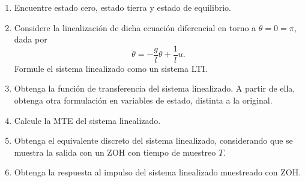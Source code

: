 \documentclass[
  11pt,
  letterpaper,
   addpoints,
  answers
  ]{exam}
\begin{document}
\begin{questions}
\begin{enumerate}
    \item Encuentre estado cero, estado tierra y estado de equilibrio.
    \item Considere la linealización de dicha ecuación diferencial en torno a $\theta = 0 = \pi$, dada por
    \begin{equation}
        \ddot{\theta} = -\frac{g}{l} \theta + \frac{1}{l} u.
    \end{equation}
    Formule el sistema linealizado como un sistema LTI.
    \item Obtenga la función de transferencia del sistema linealizado. A partir de ella, obtenga otra formulación en variables de estado, distinta a la original.
    \item Calcule la MTE del sistema linealizado.
    \item Obtenga el equivalente discreto del sistema linealizado, considerando que se muestra la salida con un ZOH con tiempo de muestreo $T$.
    \item Obtenga la respuesta al impulso del sistema linealizado muestreado con ZOH.
\end{enumerate}
\begin{solution}


\end{solution}
\end{questions}
\end{document}
